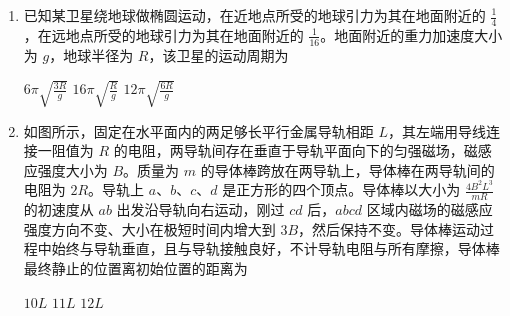 \documentclass[\gkver]{gaokaozhenti}
\begin{document}
\begin{enumerate}
{联立解得 $ k = \frac{\sqrt{3}mg}{3R} $。

故选 $ C $。
}
\item
已知某卫星绕地球做椭圆运动，在近地点所受的地球引力为其在地面附近的 $ \frac{1}{4} $，在远地点所受的地球引力为其在地面附近的 $ \frac{1}{16} $。地面附近的重力加速度大小为 $ g $，地球半径为 $ R $，该卫星的运动周期为 


{$ 6 \pi\sqrt {\frac{{3R}}{g}} $}
{$ 16 \pi\sqrt {\frac{{R}}{g}} $}
{$ 12 \pi\sqrt {\frac{{6R}}{g}} $}


\item
如图所示，固定在水平面内的两足够长平行金属导轨相距 $ L $，其左端用导线连接一阻值为 $ R $ 的电阻，两导轨间存在垂直于导轨平面向下的匀强磁场，磁感应强度大小为 $ B $。质量为 $ m $ 的导体棒跨放在两导轨上，导体棒在两导轨间的电阻为 $ 2 R $。导轨上 $ a $、$ b $、$ c $、$ d $ 是正方形的四个顶点。导体棒以大小为 $ \frac{{4{B^2}{L^3}}}{{mR}} $ 的初速度从 $ ab $ 出发沿导轨向右运动，刚过 $ cd $ 后，$ abcd $ 区域内磁场的磁感应强度方向不变、大小在极短时间内增大到 $ 3 B $，然后保持不变。导体棒运动过程中始终与导轨垂直，且与导轨接触良好，不计导轨电阻与所有摩擦，导体棒最终静止的位置离初始位置的距离为 
\onepicture[w=4.10cm]{}

{$ 10 L $}
{$ 11 L $}
{$ 12 L $}


\end{enumerate}
\end{document}

